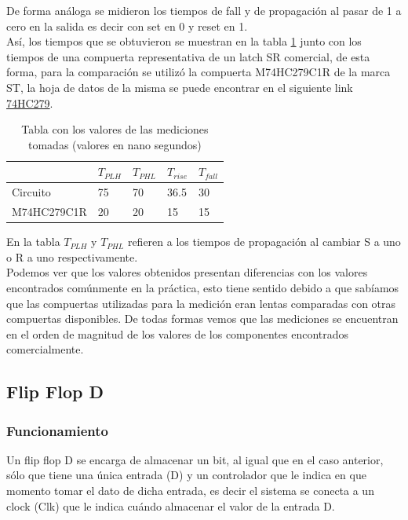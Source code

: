 %
\noindent
De forma análoga se midieron los tiempos de fall y de propagación al pasar de 1 a cero en la salida es decir con set en 0 y reset en 1.\\
%
\noindent
Así, los tiempos que se obtuvieron se muestran en la tabla \ref{ej6_tabla_mediciones_latch} junto con los tiempos de una compuerta representativa de un latch SR comercial, de esta forma, para la comparación se utilizó la compuerta M74HC279C1R de la marca ST, la hoja de datos de la misma se puede encontrar en el siguiente link \href{http://pdf.datasheetcatalog.com/datasheets2/24/245012_1.pdf}{74HC279}.
%
\begin{table}[H]
\caption{Tabla con los valores de las mediciones tomadas (valores en nano segundos)}
\label{ej6_tabla_mediciones_latch}
\centering
\begin{tabular}{|l||l|l|l|l|}
\hline 
            & $T_{PLH}$ & $T_{PHL}$ & $T_{rise}$ & $T_{fall}$ \\ \hline \hline
Circuito    & 75        & 70        & 36.5       & 30         \\ \hline
M74HC279C1R & 20        & 20        & 15         & 15         \\ \hline
\end{tabular}
\end{table}
%
\noindent
En la tabla $T_{PLH}$ y $T_{PHL}$ refieren a los tiempos de propagación al cambiar S a uno o R a uno respectivamente.\\
Podemos ver que los valores obtenidos presentan diferencias con los valores encontrados comúnmente en la práctica, esto tiene sentido debido a que sabíamos que las compuertas utilizadas para la medición eran lentas comparadas con otras compuertas disponibles. De todas formas vemos que las mediciones se encuentran en el orden de magnitud de los valores de los componentes encontrados comercialmente.
%
\subsection{Flip Flop D}
%
\subsubsection{Funcionamiento}
\noindent
Un flip flop D se encarga de almacenar un bit, al igual que en el caso anterior, sólo que tiene una única entrada (D) y un controlador que le indica en que momento tomar el dato de dicha entrada, es decir el sistema se conecta a un clock (Clk) que le indica cuándo almacenar el valor de la entrada D.
%
